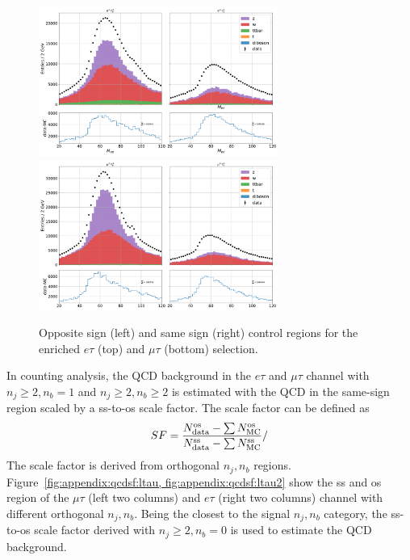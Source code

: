 \begin{figure}
    \centering
    \includegraphics[width=0.7\textwidth]{chapters/Analysis/sectionBackground/figures/ltau_kinematics/etau_cr.pdf}
    \includegraphics[width=0.7\textwidth]{chapters/Analysis/sectionBackground/figures/ltau_kinematics/mutau_cr.pdf}
    \caption{Opposite sign (left) and same sign (right) control regions for the \PZ enriched $e\tau$ (top) and $\mu\tau$ (bottom) selection.}
    \label{fig:ltau_fakes}
\end{figure}


In counting analysis, the QCD background in the $e\tau$ and $\mu\tau$ channel with $n_j\geq 2,n_b=1$ and
$n_j\geq 2,n_b\geq2$ is estimated with the QCD in the same-sign region scaled by a ss-to-os scale factor.
The scale factor can be defined as
\begin{equation}
    SF = \frac{N^{\rm{os}}_{\rm{data}} - \sum N^{\rm{os}}_{\rm{MC}} } {N^{\rm{ss}}_{\rm{data}} - \sum N^{\rm{ss}}_{\rm{MC}} }/
\end{equation}
\noindent The scale factor is derived from orthogonal $n_j,n_b$ regions.
Figure~\ref{fig:appendix:qcdsf:ltau, fig:appendix:qcdsf:ltau2} show the ss and os region of the $\mu\tau$ (left two columns) and 
$e\tau$ (right two columns) channel with different orthogonal $n_j,n_b$. Being the closest to the signal
$n_j,n_b$ category, the ss-to-os scale factor derived with $n_j\geq2,n_b=0$ is used to estimate the QCD 
background.


